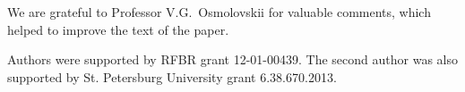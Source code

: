\vskip 40pt

We are grateful to Professor V.G.~Osmolovskii for valuable comments,
which helped to improve the text of the paper.

Authors were supported by RFBR grant 12-01-00439.
The second author was also supported by St. Petersburg University grant 6.38.670.2013.